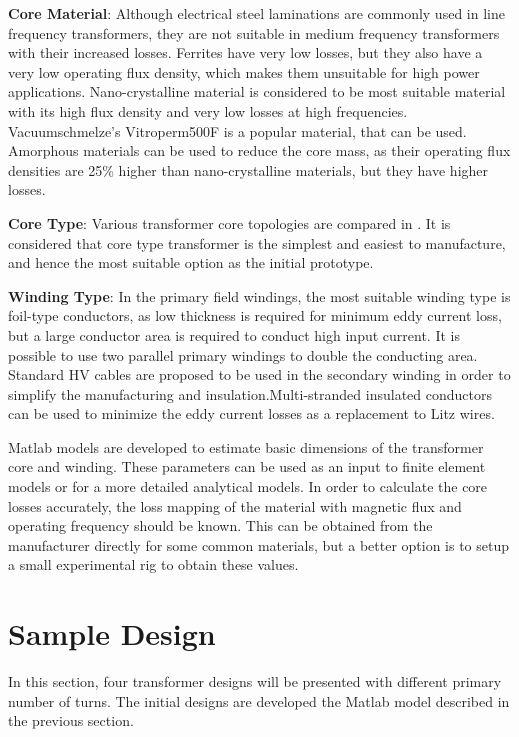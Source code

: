 \documentclass[a4paper, 11pt]{article} %
\begin{document}
\textbf{Core Material}: Although electrical steel laminations are commonly used in line frequency transformers, they are not suitable in medium frequency transformers with their increased losses. Ferrites have very low losses, but they also have a very low operating flux density, which makes them unsuitable for high power applications. Nano-crystalline material is considered to be most suitable material with its high flux density and very low losses at high frequencies. Vacuumschmelze's Vitroperm500F is a popular material, that can be used. Amorphous materials can be used to reduce the core mass, as their operating flux densities are 25\% higher than nano-crystalline materials, but they have higher losses.

\textbf{Core Type}: Various transformer core topologies are compared in \cite{Agheb2012}. It is considered that core type transformer is the simplest and easiest to manufacture, and hence the most suitable option as the initial prototype.

\textbf{Winding Type}: In the primary field windings, the most suitable winding type is foil-type conductors, as low thickness is required for minimum eddy current loss, but a large conductor area is required to conduct high input current. It is possible to use two parallel primary windings to double the conducting area. Standard HV cables are proposed to be used in the secondary winding in order to simplify the manufacturing and insulation.Multi-stranded insulated conductors can be used to minimize the eddy current losses as a replacement to Litz wires.

Matlab models are developed to estimate basic dimensions of the transformer core and winding. These parameters can be used as an input to finite element models or for a more detailed analytical models. In order to calculate the core losses accurately, the loss mapping of the material with magnetic flux and operating frequency should be known. This can be obtained from the manufacturer directly for some common materials, but a better option is to setup a small experimental rig to obtain these values.

\clearpage

\section{Sample Design}

In this section, four transformer designs will be presented with different primary number of turns. The initial designs are developed the Matlab model described in the previous section.
\end{document}
